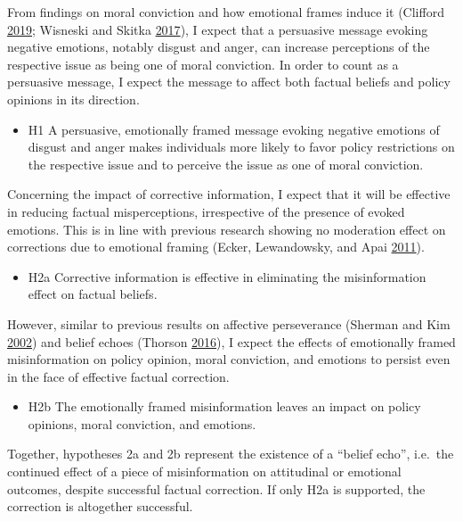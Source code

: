 \documentclass[
  12pt,
]{article}
\providecommand{\tightlist}{%
  \setlength{\itemsep}{0pt}\setlength{\parskip}{0pt}}
\begin{document}
From findings on moral conviction and how emotional frames induce it (Clifford \protect\hyperlink{ref-clifford2019emotional}{2019}; Wisneski and Skitka \protect\hyperlink{ref-wisneski2017moralization}{2017}), I expect that a persuasive message evoking negative emotions, notably disgust and anger, can increase perceptions of the respective issue as being one of moral conviction. In order to count as a persuasive message, I expect the message to affect both factual beliefs and policy opinions in its direction.

\begin{itemize}
\tightlist
\item
  H1 A persuasive, emotionally framed message evoking negative emotions of disgust and anger makes individuals more likely to favor policy restrictions on the respective issue and to perceive the issue as one of moral conviction.
\end{itemize}

Concerning the impact of corrective information, I expect that it will be effective in reducing factual misperceptions, irrespective of the presence of evoked emotions. This is in line with previous research showing no moderation effect on corrections due to emotional framing (Ecker, Lewandowsky, and Apai \protect\hyperlink{ref-ecker2011terrorists}{2011}).

\begin{itemize}
\tightlist
\item
  H2a Corrective information is effective in eliminating the misinformation effect on factual beliefs.
\end{itemize}

However, similar to previous results on affective perseverance (Sherman and Kim \protect\hyperlink{ref-sherman2002affective}{2002}) and belief echoes (Thorson \protect\hyperlink{ref-thorson2016belief}{2016}), I expect the effects of emotionally framed misinformation on policy opinion, moral conviction, and emotions to persist even in the face of effective factual correction.

\begin{itemize}
\tightlist
\item
  H2b The emotionally framed misinformation leaves an impact on policy opinions, moral conviction, and emotions.
\end{itemize}

Together, hypotheses 2a and 2b represent the existence of a ``belief echo'', i.e.~the continued effect of a piece of misinformation on attitudinal or emotional outcomes, despite successful factual correction. If only H2a is supported, the correction is altogether successful.
\end{document}
